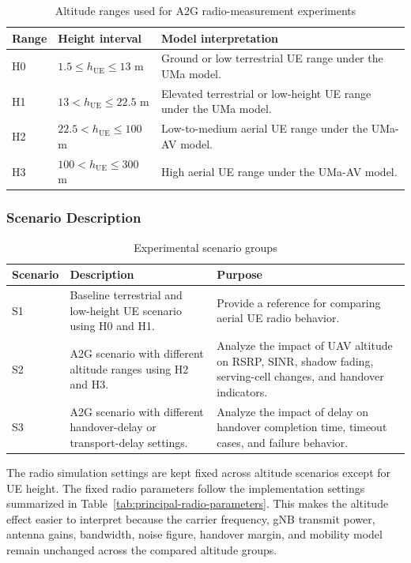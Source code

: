 \begin{table}[H]
\centering
\caption{Altitude ranges used for A2G radio-measurement experiments}
\small
\renewcommand{\arraystretch}{1.12}
\begin{tabularx}{\textwidth}{p{2.2cm}p{3.2cm}X}
\toprule
Range & Height interval & Model interpretation\\
\midrule
H0 & \(1.5\le h_{\mathrm{UE}}\le13\) m & Ground or low terrestrial UE range under the UMa model.\\
\addlinespace[2pt]
H1 & \(13<h_{\mathrm{UE}}\le22.5\) m & Elevated terrestrial or low-height UE range under the UMa model.\\
\addlinespace[2pt]
H2 & \(22.5<h_{\mathrm{UE}}\le100\) m & Low-to-medium aerial UE range under the UMa-AV model.\\
\addlinespace[2pt]
H3 & \(100<h_{\mathrm{UE}}\le300\) m & High aerial UE range under the UMa-AV model.\\
\bottomrule
\end{tabularx}
\renewcommand{\arraystretch}{1.0}
\label{tab:altitude-ranges-a2g}
\end{table}

\subsubsection{Scenario Description}

\begin{table}[H]
\centering
\caption{Experimental scenario groups}
\small
\begin{tabularx}{\textwidth}{p{1.7cm}X X}
\toprule
Scenario & Description & Purpose\\
\midrule
S1 & Baseline terrestrial and low-height UE scenario using H0 and H1. & Provide a reference for comparing aerial UE radio behavior.\\
\addlinespace[2pt]
S2 & A2G scenario with different altitude ranges using H2 and H3. & Analyze the impact of UAV altitude on RSRP, SINR, shadow fading, serving-cell changes, and handover indicators.\\
\addlinespace[2pt]
S3 & A2G scenario with different handover-delay or transport-delay settings. & Analyze the impact of delay on handover completion time, timeout cases, and failure behavior.\\
\bottomrule
\end{tabularx}
\label{tab:experimental-scenario-groups}
\end{table}

The radio simulation settings are kept fixed across altitude scenarios except for UE height. The fixed radio parameters follow the implementation settings summarized in Table~\ref{tab:principal-radio-parameters}. This makes the altitude effect easier to interpret because the carrier frequency, gNB transmit power, antenna gains, bandwidth, noise figure, handover margin, and mobility model remain unchanged across the compared altitude groups.

